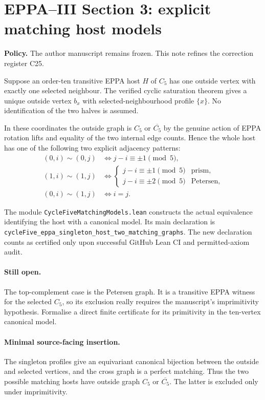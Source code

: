 \documentclass[11pt]{article}
\begin{document}
\section*{EPPA--III Section 3: explicit matching host models}
\textbf{Policy.} The author manuscript remains frozen.
This note refines the correction register C25.

Suppose an order-ten transitive EPPA host \(H\) of \(C_5\)
has one outside vertex with exactly one selected neighbour.
The verified cyclic saturation theorem gives a unique outside
vertex \(b_x\) with selected-neighbourhood profile \(\{x\}\).
No identification of the two halves is assumed.

In these coordinates the outside graph is \(C_5\) or
\(\overline{C_5}\) by the genuine action of EPPA rotation lifts
and equality of the two internal edge counts. Hence the whole
host has one of the following two explicit adjacency patterns:
\[
\begin{split}
 (0,i)\sim(0,j)&\iff j-i\equiv\pm1\pmod5,\\
 (1,i)\sim(1,j)&\iff
 \begin{cases}j-i\equiv\pm1\pmod5&\text{prism},\\
 j-i\equiv\pm2\pmod5&\text{Petersen},\end{cases}\\
 (0,i)\sim(1,j)&\iff i=j .
\end{split}
\]

The module \texttt{CycleFiveMatchingModels.lean} constructs the
actual equivalence identifying the host with a canonical model.
Its main declaration is
\texttt{cycleFive\_eppa\_singleton\_host\_two\_matching\_graphs}.
The new declaration counts as certified only upon successful
GitHub Lean CI and permitted-axiom audit.

\paragraph{Still open.}
The top-complement case is the Petersen graph. It is a
transitive EPPA witness for the selected \(C_5\), so its
exclusion really requires the manuscript's imprimitivity
hypothesis. Formalise a direct finite certificate for its
primitivity in the ten-vertex canonical model.

\paragraph{Minimal source-facing insertion.}
The singleton profiles give an equivariant canonical bijection
between the outside and selected vertices, and the cross
graph is a perfect matching. Thus the two possible matching
hosts have outside graph \(C_5\) or \(\overline{C_5}\).
The latter is excluded only under imprimitivity.
\end{document}
